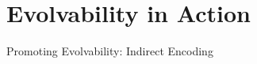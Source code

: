 \section{Evolvability in Action}

\begin{frame}{Promoting Evolvability: Indirect Encoding}
  
\end{frame}
